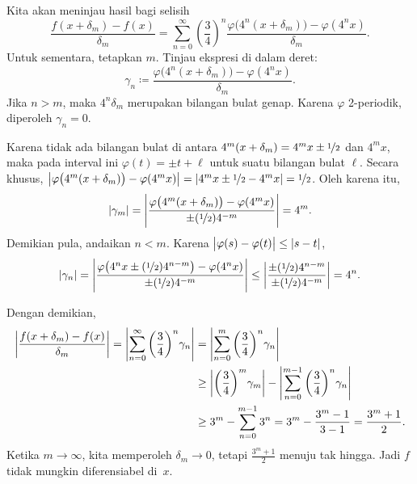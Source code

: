 \begin{example}
Kita akan meninjau hasil bagi selisih
\begin{equation*}
\frac{f(x+\delta_m)-f(x)}{\delta_m}
=
\sum_{n=0}^\infty 
{\left(\frac{3}{4}\right)}^n
\frac{\varphi\bigl(4^n(x+\delta_m)\bigr)-\varphi(4^nx)}{\delta_m} .
\end{equation*}
Untuk sementara, tetapkan $m$.  Tinjau ekspresi di dalam deret:
\begin{equation*}
\gamma_{n} \coloneqq
\frac{\varphi\bigl(4^n(x+\delta_m)\bigr)-\varphi(4^nx)}{\delta_m} .
\end{equation*}
Jika $n > m$, maka $4^n\delta_m$ merupakan bilangan bulat genap.  Karena $\varphi$
2-periodik, diperoleh $\gamma_n = 0$.

Karena tidak ada bilangan bulat di antara 
$4^m(x+\delta_m) = 4^m x\pm\nicefrac{1}{2}$ dan $4^m x$, maka pada interval ini
$\varphi(t) = \pm t + \ell$ untuk suatu bilangan bulat $\ell$.
Secara khusus,
$\left\lvert {\varphi\bigl(4^m(x+ \delta_m)\bigr)-\varphi(4^mx)} \right\rvert =
\left\lvert {4^mx\pm\nicefrac{1}{2}-4^mx} \right\rvert = \nicefrac{1}{2}$.  Oleh karena itu,
\begin{equation*}
\lvert {\gamma_m} \rvert =
\left\lvert {
\frac{\varphi\bigl(4^m(x+\delta_m)\bigr)-\varphi(4^mx)}{\pm (\nicefrac{1}{2}) 4^{-m}}
} \right\rvert
= 4^m .
\end{equation*}
Demikian pula, andaikan $n < m$.  Karena $\bigl\lvert {\varphi(s) -\varphi(t)} \bigr\rvert \leq
\lvert {s-t} \rvert$,
\begin{equation*}
\lvert {\gamma_n} \rvert =
\left\lvert {\frac{\varphi\bigl(4^nx\pm(\nicefrac{1}{2})4^{n-m}\bigr)-\varphi(4^nx)}{\pm
(\nicefrac{1}{2}) 4^{-m}}} \right\rvert
\leq
\left\lvert {\frac{\pm(\nicefrac{1}{2})4^{n-m}}{\pm (\nicefrac{1}{2}) 4^{-m}}} \right\rvert = 4^n
.
\end{equation*}

Dengan demikian,
\begin{equation*}
\begin{split}
\left\lvert {
\frac{f(x+\delta_m)-f(x)}{\delta_m}
} \right\rvert
=
\left\lvert {
\sum_{n=0}^\infty 
{\left(\frac{3}{4}\right)}^n
\gamma_n
} \right\rvert
& =
\left\lvert {
\sum_{n=0}^m 
{\left(\frac{3}{4}\right)}^n
\gamma_n
} \right\rvert
\\
& \geq
\left\lvert {
{\left(\frac{3}{4}\right)}^m
\gamma_m} \right\rvert
-
\left\lvert {
\sum_{n=0}^{m-1} 
{\left(\frac{3}{4}\right)}^n
\gamma_n
} \right\rvert
\\
& \geq
3^m
-
\sum_{n=0}^{m-1} 
3^n
=
3^m
-
\frac{3^{m}-1}{3-1}
=
\frac{3^m +1}{2} .
\end{split}
\end{equation*}
Ketika $m \to \infty$, kita memperoleh
$\delta_m \to 0$, tetapi $\frac{3^m+1}{2}$
menuju tak hingga.  Jadi $f$ tidak mungkin diferensiabel di~$x$.
\end{example}

